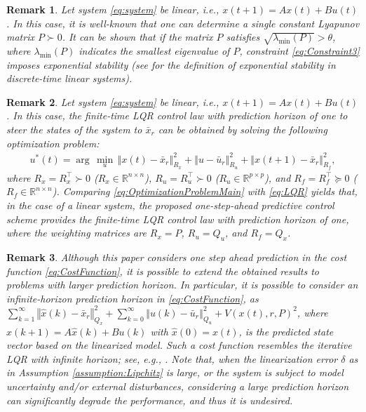 \documentclass[1p,times]{elsarticle}
\newtheorem{remark}{Remark}
\begin{document}
\begin{remark}\label{eq:ExponentialStability}
Let system \eqref{eq:system} be linear, i.e., $x(t+1)=Ax(t)+Bu(t)$. In this case, it is well-known that one can determine a single constant Lyapunov matrix $P\succ0$. It can be shown that if the matrix $P$ satisfies $\sqrt{\lambda_{\min}(P)}>\theta$, where $\lambda_{\min}(P)$ indicates the smallest eigenvalue of $P$, constraint \eqref{eq:Constraint3} imposes exponential stability (see \cite{Aitken1994} for the definition of exponential stability in discrete-time linear systems).
\end{remark}



\begin{remark}\label{remark:LocalOptimality}
Let system \eqref{eq:system} be linear, i.e., $x(t+1)=Ax(t)+Bu(t)$. In this case, the finite-time LQR control law with prediction horizon of one to steer the states of the system to $\bar{x}_r$ can be obtained by solving the following optimization problem:
\begin{align}\label{eq:LQR}
u^\ast(t)=\arg\,\min_{u}\,\left\Vert x(t)-\bar{x}_r\right\Vert^2_{R_x}+\left\Vert u-\bar{u}_r\right\Vert^2_{R_u} +\left\Vert x(t+1)-\bar{x}_r\right\Vert^2_{R_f},
\end{align}
where $R_x=R_x^{\top} \succ 0$ ($R_x\in\mathbb{R}^{n \times n}$), $R_u=R_u^{\top} \succ 0$ ($R_u\in \mathbb{R}^{p \times p}$), and $R_f=R_f^{\top}\succeq 0$ ($R_f \in \mathbb{R}^{n \times n}$). Comparing \eqref{eq:OptimizationProblemMain} with \eqref{eq:LQR} yields that, in the case of a linear system, the proposed one-step-ahead predictive control scheme provides the finite-time LQR control law with prediction horizon of one, where the weighting matrices are $R_x=P$, $R_u=Q_u$, and $R_f=Q_x$.
\end{remark} 



\begin{remark}\label{remark:InfiniteHorizonLQR}
Although this paper considers one step ahead prediction in the cost function \eqref{eq:CostFunction}, it is possible to extend the obtained results to problems with larger prediction horizon. In particular, it is possible to consider an infinite-horizon prediction horizon in \eqref{eq:CostFunction}, as $\sum_{k=1}^\infty\left\Vert \hat{x}(k)-\bar{x}_r\right\Vert^2_{Q_x}+\sum_{k=0}^\infty\left\Vert u(k)-\bar{u}_r\right\Vert^2_{Q_u}+V\left(x(t),r,P\right)^2$, where $\hat{x}(k+1)=A\hat{x}(k)+Bu(k)$ with $\hat{x}(0)=x(t)$, is the predicted state vector based on the linearized model. Such a cost function resembles the iterative LQR with infinite horizon; see, e.g., \cite{Li2004,Todorov2005}. Note that, when the linearization error $\delta$ as in Assumption \ref{assumption:Lipchitz} is large, or the system is subject to model uncertainty and/or external disturbances, considering a large prediction horizon can significantly degrade the performance, and thus it is undesired.  
\end{remark}
\end{document}
